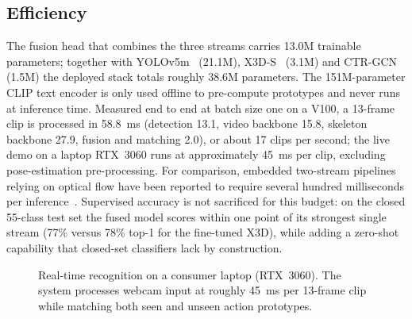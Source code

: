 \subsection{Efficiency}
The fusion head that combines the three streams carries 13.0M trainable
parameters; together with YOLOv5m~\cite{jocher2020yolov5} (21.1M),
X3D-S~\cite{feichtenhofer2020x3d} (3.1M) and CTR-GCN~\cite{chen2021ctrgcn}
(1.5M) the deployed stack totals roughly 38.6M parameters. The 151M-parameter
CLIP text encoder is only used offline to pre-compute prototypes and never
runs at inference time. Measured end to end at batch size one on a V100, a
13-frame clip is processed in 58.8~ms (detection 13.1, video backbone 15.8,
skeleton backbone 27.9, fusion and matching 2.0), or about 17 clips per
second; the live demo on a laptop RTX~3060 runs at approximately 45~ms per
clip, excluding pose-estimation pre-processing. For comparison, embedded
two-stream pipelines relying on optical flow have been reported to require
several hundred milliseconds per inference~\cite{wang2024rthar}. Supervised
accuracy is not sacrificed for this budget: on the closed 55-class test set
the fused model scores within one point of its strongest single stream
(77\% versus 78\% top-1 for the fine-tuned X3D), while adding a zero-shot
capability that closed-set classifiers lack by construction.

\begin{figure}[t]
\centering
{}
\caption{Real-time recognition on a consumer laptop (RTX~3060). The system
processes webcam input at roughly 45~ms per 13-frame clip while matching both
seen and unseen action prototypes.}
\label{fig:demo}
\end{figure}

